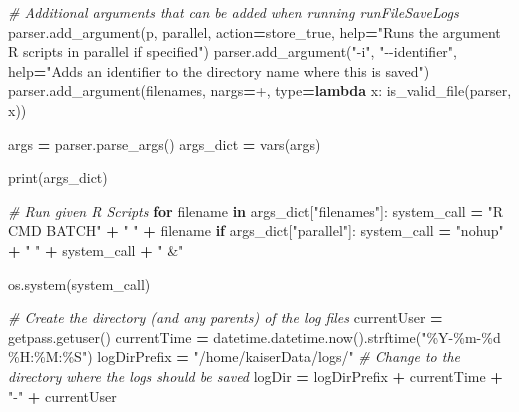 \documentclass[
]{book}
\newenvironment{Shaded}{\begin{snugshade}}{\end{snugshade}}
\newcommand{\BuiltInTok}[1]{#1}
\newcommand{\CommentTok}[1]{\textcolor[rgb]{0.56,0.35,0.01}{\textit{#1}}}
\newcommand{\ControlFlowTok}[1]{\textcolor[rgb]{0.13,0.29,0.53}{\textbf{#1}}}
\newcommand{\KeywordTok}[1]{\textcolor[rgb]{0.13,0.29,0.53}{\textbf{#1}}}
\newcommand{\NormalTok}[1]{#1}
\newcommand{\OperatorTok}[1]{\textcolor[rgb]{0.81,0.36,0.00}{\textbf{#1}}}
\newcommand{\SpecialCharTok}[1]{\textcolor[rgb]{0.00,0.00,0.00}{#1}}
\newcommand{\StringTok}[1]{\textcolor[rgb]{0.31,0.60,0.02}{#1}}
\begin{document}
\begin{Shaded}
\begin{Highlighting}[]
\CommentTok{\# Additional arguments that can be added when running runFileSaveLogs}
\NormalTok{parser.add\_argument(}\StringTok{\textquotesingle{}{-}p\textquotesingle{}}\NormalTok{, }\StringTok{\textquotesingle{}{-}{-}parallel\textquotesingle{}}\NormalTok{, action}\OperatorTok{=}\StringTok{\textquotesingle{}store\_true\textquotesingle{}}\NormalTok{, }\BuiltInTok{help}\OperatorTok{=}\StringTok{"Runs the argument R scripts in parallel if specified"}\NormalTok{)}
\NormalTok{parser.add\_argument(}\StringTok{"{-}i"}\NormalTok{, }\StringTok{"{-}{-}identifier"}\NormalTok{, }\BuiltInTok{help}\OperatorTok{=}\StringTok{"Adds an identifier to the directory name where this is saved"}\NormalTok{)}
\NormalTok{parser.add\_argument(}\StringTok{\textquotesingle{}filenames\textquotesingle{}}\NormalTok{, nargs}\OperatorTok{=}\StringTok{\textquotesingle{}+\textquotesingle{}}\NormalTok{, }\BuiltInTok{type}\OperatorTok{=}\KeywordTok{lambda}\NormalTok{ x: is\_valid\_file(parser, x))}

\NormalTok{args }\OperatorTok{=}\NormalTok{ parser.parse\_args()}
\NormalTok{args\_dict }\OperatorTok{=} \BuiltInTok{vars}\NormalTok{(args)}

\BuiltInTok{print}\NormalTok{(args\_dict)}

\CommentTok{\# Run given R Scripts}
\ControlFlowTok{for}\NormalTok{ filename }\KeywordTok{in}\NormalTok{ args\_dict[}\StringTok{"filenames"}\NormalTok{]:}
\NormalTok{  system\_call }\OperatorTok{=} \StringTok{"R CMD BATCH"} \OperatorTok{+} \StringTok{" "} \OperatorTok{+}\NormalTok{ filename}
  \ControlFlowTok{if}\NormalTok{ args\_dict[}\StringTok{"parallel"}\NormalTok{]: }
\NormalTok{    system\_call }\OperatorTok{=} \StringTok{"nohup"} \OperatorTok{+} \StringTok{" "} \OperatorTok{+}\NormalTok{ system\_call }\OperatorTok{+} \StringTok{" \&"}

\NormalTok{  os.system(system\_call)}

\CommentTok{\# Create the directory (and any parents) of the log files}
\NormalTok{currentUser }\OperatorTok{=}\NormalTok{ getpass.getuser()}
\NormalTok{currentTime }\OperatorTok{=}\NormalTok{ datetime.datetime.now().strftime(}\StringTok{"\%Y{-}\%m{-}}\SpecialCharTok{\%d}\StringTok{ \%H:\%M:\%S"}\NormalTok{)}
\NormalTok{logDirPrefix }\OperatorTok{=} \StringTok{"/home/kaiserData/logs/"} \CommentTok{\# Change to the directory where the logs should be saved}
\NormalTok{logDir }\OperatorTok{=}\NormalTok{ logDirPrefix }\OperatorTok{+}\NormalTok{ currentTime }\OperatorTok{+} \StringTok{"{-}"} \OperatorTok{+}\NormalTok{ currentUser }


\end{Highlighting}
\end{Shaded}
\end{document}
